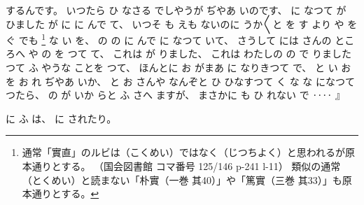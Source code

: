 するんです。
%
いつたら
ひ
なさる
でしやうが
ぢやあ
%
いのです、
%
に
なつて
が
ひました
が
に
に
んで
て、
%
いつそ
も
えも
ないのに
うか〳〵と
を
す
より
や
を
ぐ
でも
\footnote{%
通常「實直」のルビは（こくめい）ではなく（じつちよく）と思われるが原本通りとする。
（国会図書館 コマ番号 125/146 p-241 l-11）
類似の通常（とくめい）と読まない「朴實（一巻 其40）」や「篤實（三巻 其33）」も原本通りとする。
}%
な
い
を、
%
の%
の
に
んで
に
なつて
いて、
%
さうして
には
さんの
ところへ
や%
の
を
つて
て、
%
これは
が
りました、
%
これは
わたしの
の
で
りました
つて
ふ
やうな
ことを
つて、
%
ほんとに
お
がまあ
に
なりきつて
で、
%
と
い
お
を
お
れ
ぢやあ
いか、
%
と
お
さんや
なんぞと
ひ
ひなすつて
く%
な
な
になつて
つたら、
%
の
が
いか
らと
ふ
さへ
ますが、
%
まさかに
も
ひ
れない
で
‥‥
』

%
に
ふ
は、
%
に
されたり。


